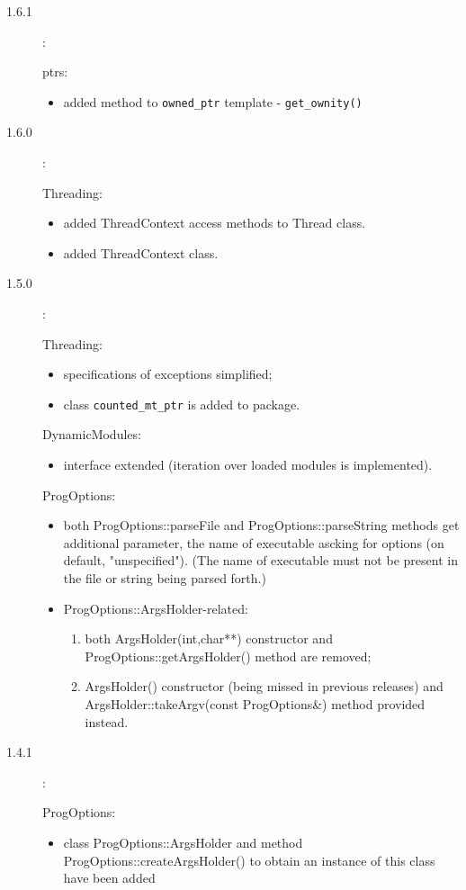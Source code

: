 \documentclass[10pt]{article}
\newenvironment{component}[1]{\par#1:\begin{itemize}}{\end{itemize}}
\begin{document}
\begin{description}
 \item [1.6.1]:
       \begin{component}{ptrs} 
         \item added method to \verb|owned_ptr| template - \verb|get_ownity()|
       \end{component}
 \item [1.6.0]:
       \begin{component}{Threading} 
         \item added ThreadContext access methods to Thread class.
         \item added ThreadContext class.
       \end{component}
 \item [1.5.0]:
       \begin{component}{Threading} 
         \item specifications of exceptions simplified;
         \item class \verb|counted_mt_ptr| is added to package.
       \end{component}
       \begin{component}{DynamicModules}
         \item interface extended (iteration over loaded modules is implemented).
       \end{component} 
       \begin{component}{ProgOptions}
       \item both ProgOptions::parseFile and ProgOptions::parseString methods
             get additional parameter, the name of executable ascking for options
             (on default, "unspecified").
             (The name of executable must not be present in the file or string being parsed forth.)
       \item ProgOptions::ArgsHolder-related:
             \begin{enumerate}
             \item both ArgsHolder(int,char**) constructor and ProgOptions::getArgsHolder()
                   method are removed;
             \item ArgsHolder() constructor (being missed in previous releases)
                   and ArgsHolder::takeArgv(const ProgOptions\&) method provided instead.
             \end{enumerate} 
       \end{component}

 \item [1.4.1]:
       \begin{component}{ProgOptions}
         \item class ProgOptions::ArgsHolder and method ProgOptions::createArgsHolder()
               to obtain an instance of this class have been added
       \end{component}


\end{description}
\end{document}
